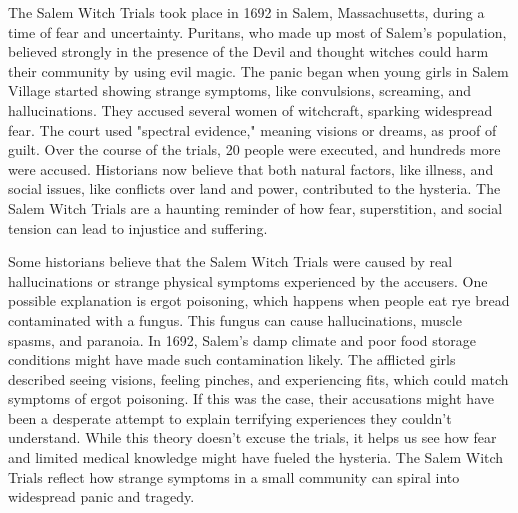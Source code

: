 \documentclass[12pt]{article}
\begin{document}
\begin{tcolorbox}[colframe=black!60, colback=white, 
coltitle=black, colbacktitle=black!15, fonttitle=\bfseries\Large, 
title=Source 1: Understanding the History of the Salem Witch Trials, halign title=center, left=10pt, right=10pt, top=10pt, bottom=15pt]
The Salem Witch Trials took place in 1692 in Salem, Massachusetts, during a time of fear and uncertainty. Puritans, who made up most of Salem’s population, believed strongly in the presence of the Devil and thought witches could harm their community by using evil magic. The panic began when young girls in Salem Village started showing strange symptoms, like convulsions, screaming, and hallucinations. They accused several women of witchcraft, sparking widespread fear. The court used "spectral evidence," meaning visions or dreams, as proof of guilt. Over the course of the trials, 20 people were executed, and hundreds more were accused. Historians now believe that both natural factors, like illness, and social issues, like conflicts over land and power, contributed to the hysteria. The Salem Witch Trials are a haunting reminder of how fear, superstition, and social tension can lead to injustice and suffering. 

 
\end{tcolorbox}

\vspace{1em}

\begin{tcolorbox}[colframe=black!60, colback=white, 
coltitle=black, colbacktitle=black!15, fonttitle=\bfseries\Large, 
title=Source 2: Real Hallucinations and Fear of the Unknown, halign title=center, left=10pt, right=10pt, top=10pt, bottom=15pt]
Some historians believe that the Salem Witch Trials were caused by real hallucinations or strange physical symptoms experienced by the accusers. One possible explanation is ergot poisoning, which happens when people eat rye bread contaminated with a fungus. This fungus can cause hallucinations, muscle spasms, and paranoia. In 1692, Salem’s damp climate and poor food storage conditions might have made such contamination likely. The afflicted girls described seeing visions, feeling pinches, and experiencing fits, which could match symptoms of ergot poisoning. If this was the case, their accusations might have been a desperate attempt to explain terrifying experiences they couldn’t understand. While this theory doesn’t excuse the trials, it helps us see how fear and limited medical knowledge might have fueled the hysteria. The Salem Witch Trials reflect how strange symptoms in a small community can spiral into widespread panic and tragedy.

 
\end{tcolorbox}
\end{document}
